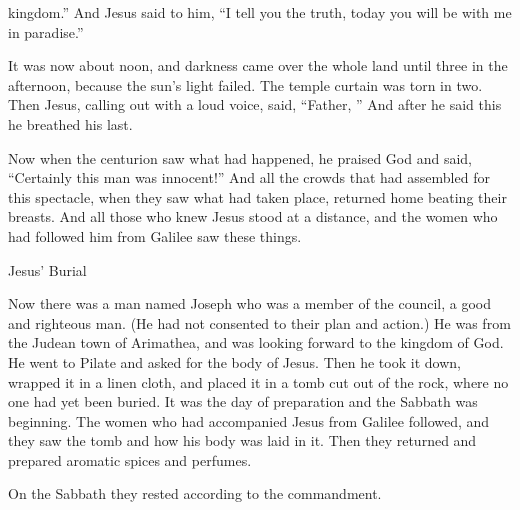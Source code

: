 {kingdom.”
And
Jesus said
to him,
“I tell
you
the truth,
today
you will be
with
me
in
paradise.”
\par }{\PP {}It was
now
about
noon,
and
darkness
came
over
the whole
land
until
three in the afternoon,
because the sun’s light
failed.
The temple
curtain
was torn
in two.
Then
Jesus,
calling out
with a
loud
voice,
said,
“Father,
{}”
And
after he said
this
he breathed his last.
\par }{\PP {}Now when
the centurion
saw
what had happened,
he praised
God
and said,
“Certainly
this
man
was
innocent!”
And
all
the crowds
that had assembled
for
this
spectacle,
when
they saw
what had taken place,
returned home
beating
their breasts.
And
all
those who knew
Jesus
stood
at
a distance,
and
the women
who had followed
him
from
Galilee
saw
these things.
\par }{\SH Jesus’ Burial
\par }{\PP {}Now
there was a man
named
Joseph
who was
a member of the council,
a
good
and
righteous
man.
(He
had
not
consented
to their
plan
and
action.) He was from
the Judean
town
of Arimathea,
and was looking forward
to the kingdom
of God.
He
went
to Pilate
and asked for
the body
of Jesus.
Then
he took
it down,
wrapped
it
in a linen cloth,
and
placed
it
in
a tomb
cut out of the rock,
where
no one
had
yet
been buried.
It was
the day
of preparation
and
the Sabbath
was beginning.
The women
who
had accompanied
Jesus from
Galilee
followed,
and they saw
the tomb
and
how
his
body
was laid in it.
Then
they
returned
and prepared
aromatic spices
and
perfumes.
\par }{\PP On the Sabbath
they rested
according to
the commandment.

}
